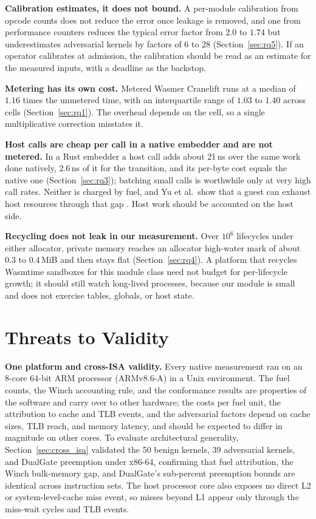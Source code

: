 \documentclass{ws-jcsc}
\begin{document}
\textbf{Calibration estimates, it does not bound.} A per-module calibration from opcode counts does not reduce the error once leakage is removed, and one from performance counters reduces the typical error factor from $2.0$ to $1.74$ but underestimates adversarial kernels by factors of 6 to 28 (Section~\ref{sec:rq5}). If an operator calibrates at admission, the calibration should be read as an estimate for the measured inputs, with a deadline as the backstop.

\textbf{Metering has its own cost.} Metered Wasmer Cranelift runs at a median of $1.16$ times the unmetered time, with an interquartile range of $1.03$ to $1.40$ across cells (Section~\ref{sec:rq1}). The overhead depends on the cell, so a single multiplicative correction misstates it.

\textbf{Host calls are cheap per call in a native embedder and are not metered.} In a Rust embedder a host call adds about 21\,ns over the same work done natively, 2.6\,ns of it for the transition, and its per-byte cost equals the native one (Section~\ref{sec:rq3}); batching small calls is worthwhile only at very high call rates. Neither is charged by fuel, and Yu et al.\ show that a guest can exhaust host resources through that gap \cite{yu2025resource}. Host work should be accounted on the host side.

\textbf{Recycling does not leak in our measurement.} Over $10^6$ lifecycles under either allocator, private memory reaches an allocator high-water mark of about 0.3 to 0.4\,MiB and then stays flat (Section~\ref{sec:rq4}). A platform that recycles Wasmtime sandboxes for this module class need not budget for per-lifecycle growth; it should still watch long-lived processes, because our module is small and does not exercise tables, globals, or host state.

\section{Threats to Validity}
\label{sec:threats}
\textbf{One platform and cross-ISA validity.} Every native measurement ran on an 8-core 64-bit ARM processor (ARMv8.6-A) in a Unix environment. The fuel counts, the Winch accounting rule, and the conformance results are properties of the software and carry over to other hardware; the costs per fuel unit, the attribution to cache and TLB events, and the adversarial factors depend on cache sizes, TLB reach, and memory latency, and should be expected to differ in magnitude on other cores. To evaluate architectural generality, Section~\ref{sec:cross_isa} validated the 50 benign kernels, 39 adversarial kernels, and DualGate preemption under x86-64, confirming that fuel attribution, the Winch bulk-memory gap, and DualGate's sub-percent preemption bounds are identical across instruction sets. The host processor core also exposes no direct L2 or system-level-cache miss event, so misses beyond L1 appear only through the miss-wait cycles and TLB events.
\end{document}
